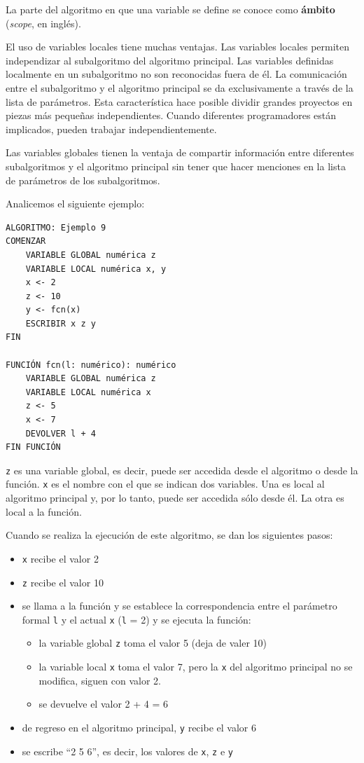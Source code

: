 \documentclass[]{book}
\providecommand{\tightlist}{%
  \setlength{\itemsep}{0pt}\setlength{\parskip}{0pt}}
\begin{document}
La parte del algoritmo en que una variable se define se conoce como \textbf{ámbito} (\emph{scope}, en inglés).

El uso de variables locales tiene muchas ventajas. Las variables locales permiten independizar al subalgoritmo del algoritmo principal. Las variables definidas localmente en un subalgoritmo no son reconocidas fuera de él. La comunicación entre el subalgoritmo y el algoritmo principal se da exclusivamente a través de la lista de parámetros. Esta característica hace posible dividir grandes proyectos en piezas más pequeñas independientes. Cuando diferentes programadores están implicados, pueden trabajar
independientemente.

Las variables globales tienen la ventaja de compartir información entre diferentes subalgoritmos y el algoritmo principal sin tener que hacer menciones en la lista de parámetros de los subalgoritmos.

Analicemos el siguiente ejemplo:

\begin{verbatim}
ALGORITMO: Ejemplo 9
COMENZAR
    VARIABLE GLOBAL numérica z
    VARIABLE LOCAL numérica x, y
    x <- 2
    z <- 10
    y <- fcn(x)
    ESCRIBIR x z y
FIN

FUNCIÓN fcn(l: numérico): numérico
    VARIABLE GLOBAL numérica z
    VARIABLE LOCAL numérica x
    z <- 5
    x <- 7
    DEVOLVER l + 4
FIN FUNCIÓN
\end{verbatim}

\texttt{z} es una variable global, es decir, puede ser accedida desde el algoritmo o desde la función. \texttt{x} es el nombre con el que se indican dos variables. Una es local al algoritmo principal y, por lo tanto, puede ser accedida sólo desde él. La otra es local a la función.

Cuando se realiza la ejecución de este algoritmo, se dan los siguientes pasos:

\begin{itemize}
\item
  \texttt{x} recibe el valor 2
\item
  \texttt{z} recibe el valor 10
\item
  se llama a la función y se establece la correspondencia entre el parámetro formal \texttt{l} y el actual \texttt{x} (\texttt{l} = 2) y se ejecuta la función:

  \begin{itemize}
  \tightlist
  \item
    la variable global \texttt{z} toma el valor 5 (deja de valer 10)
  \item
    la variable local \texttt{x} toma el valor 7, pero la \texttt{x} del algoritmo principal no se modifica, siguen con valor 2.
  \item
    se devuelve el valor 2 + 4 = 6
  \end{itemize}
\item
  de regreso en el algoritmo principal, \texttt{y} recibe el valor 6
\item
  se escribe ``2 5 6'', es decir, los valores de \texttt{x}, \texttt{z} e \texttt{y}
\end{itemize}
\end{document}
